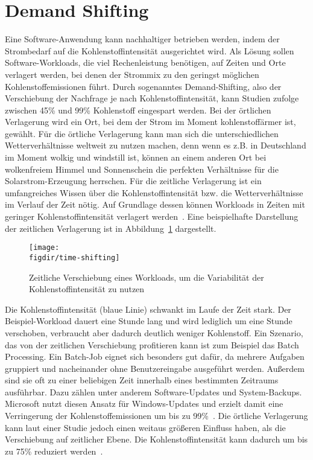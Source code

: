 \section{Demand Shifting}
Eine Software-Anwendung kann nachhaltiger betrieben werden, indem der Strombedarf auf die Kohlenstoffintensität ausgerichtet wird.
Als Lösung sollen Software-Workloads, die viel Rechenleistung benötigen, auf Zeiten und Orte verlagert werden, bei denen der Strommix zu den geringst möglichen Kohlenstoffemissionen führt.
Durch sogenanntes Demand-Shifting, also der Verschiebung der Nachfrage je nach Kohlenstoffintensität, kann Studien zufolge zwischen 45\% und 99\% Kohlenstoff eingespart werden.
Bei der örtlichen Verlagerung wird ein Ort, bei dem der Strom im Moment \glqq kohlenstoffärmer\grqq{} ist, gewählt.
Für die örtliche Verlagerung kann man sich die unterschiedlichen Wetterverhältnisse weltweit zu nutzen machen, denn wenn es z.B. in Deutschland im Moment wolkig und windstill ist, können an einem anderen Ort bei wolkenfreiem Himmel und Sonnenschein die perfekten Verhältnisse für die Solarstrom-Erzeugung herrschen.
Für die zeitliche Verlagerung ist ein umfangreiches Wissen über die Kohlenstoffintensität bzw. die Wetterverhältnisse im Verlauf der Zeit nötig.
Auf Grundlage dessen können Workloads in Zeiten mit geringer Kohlenstoffintensität verlagert werden~\cite{GreenSoftwareFoundation.2022}.
Eine beispielhafte Darstellung der zeitlichen Verlagerung ist in Abbildung~\ref{FIG:time-shifting} dargestellt.
\begin{figure}
 \caption{Zeitliche Verschiebung eines Workloads, um die Variabilität der Kohlenstoffintensität zu nutzen~\cite{Currie.2024}}
 {\texttt{[image: \\figdir/time-shifting]}}
 \label{FIG:time-shifting}
\end{figure}
Die Kohlenstoffintensität (blaue Linie) schwankt im Laufe der Zeit stark.
Der Beispiel-Workload dauert eine Stunde lang und wird lediglich um eine Stunde verschoben, verbraucht aber dadurch deutlich weniger Kohlenstoff.
Ein Szenario, das von der zeitlichen Verschiebung profitieren kann ist zum Beispiel das Batch Processing.
Ein Batch-Job eignet sich besonders gut dafür, da mehrere Aufgaben gruppiert und nacheinander ohne Benutzereingabe ausgeführt werden.
Außerdem sind sie oft zu einer beliebigen Zeit innerhalb eines bestimmten Zeitraums ausführbar.
Dazu zählen unter anderem Software-Updates und System-Backups.
Microsoft nutzt diesen Ansatz für Windows-Updates und erzielt damit eine Verringerung der Kohlenstoffemissionen um bis zu 99\%~\cite{Currie.2024}.
Die örtliche Verlagerung kann laut einer Studie jedoch einen weitaus größeren Einfluss haben, als die Verschiebung auf zeitlicher Ebene.
Die Kohlenstoffintensität kann dadurch um bis zu 75\% reduziert werden~\cite{Dodge.06212022}.

